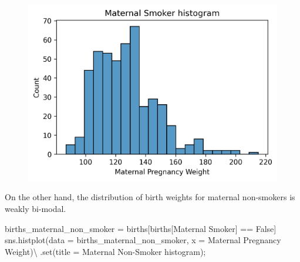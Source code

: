 \documentclass[
  letterpaper,
  DIV=11,
  numbers=noendperiod]{scrreprt}
\newenvironment{Shaded}{\begin{snugshade}}{\end{snugshade}}
\newcommand{\BuiltInTok}[1]{\textcolor[rgb]{0.00,0.23,0.31}{#1}}
\newcommand{\NormalTok}[1]{\textcolor[rgb]{0.00,0.23,0.31}{#1}}
\newcommand{\OperatorTok}[1]{\textcolor[rgb]{0.37,0.37,0.37}{#1}}
\newcommand{\StringTok}[1]{\textcolor[rgb]{0.13,0.47,0.30}{#1}}
\newcommand{\VariableTok}[1]{\textcolor[rgb]{0.07,0.07,0.07}{#1}}
\begin{document}
\begin{figure}[H]

{\centering \includegraphics{visualization_1/visualization_1_files/figure-pdf/cell-13-output-1.png}

}

\end{figure}

On the other hand, the distribution of birth weights for maternal
non-smokers is weakly bi-modal.

\begin{Shaded}
\begin{Highlighting}[]
\NormalTok{births\_maternal\_non\_smoker }\OperatorTok{=}\NormalTok{ births[births[}\StringTok{\textquotesingle{}Maternal Smoker\textquotesingle{}}\NormalTok{] }\OperatorTok{==} \VariableTok{False}\NormalTok{]}
\NormalTok{sns.histplot(data }\OperatorTok{=}\NormalTok{ births\_maternal\_non\_smoker, x }\OperatorTok{=} \StringTok{\textquotesingle{}Maternal Pregnancy Weight\textquotesingle{}}\NormalTok{)}\OperatorTok{\textbackslash{}}
\NormalTok{            .}\BuiltInTok{set}\NormalTok{(title }\OperatorTok{=} \StringTok{\textquotesingle{}Maternal Non{-}Smoker histogram\textquotesingle{}}\NormalTok{)}\OperatorTok{;}
\end{Highlighting}
\end{Shaded}
\end{document}

